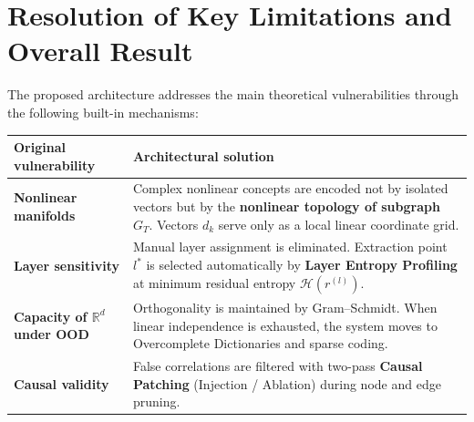 \documentclass[11pt,a4paper]{article}
\begin{document}
\section{Resolution of Key Limitations and Overall Result}
The proposed architecture addresses the main theoretical vulnerabilities through the following built-in mechanisms:
\begin{table}[h!]
\centering
\begin{tabular}{p{5cm} p{10cm}}
\toprule
\textbf{Original vulnerability} & \textbf{Architectural solution}\\
\midrule
\textbf{Nonlinear manifolds} & Complex nonlinear concepts are encoded not by isolated vectors but by the \textbf{nonlinear topology of subgraph $G_T$}. Vectors $d_k$ serve only as a local linear coordinate grid.\\
\addlinespace
\textbf{Layer sensitivity} & Manual layer assignment is eliminated. Extraction point $l^*$ is selected automatically by \textbf{Layer Entropy Profiling} at minimum residual entropy $\mathcal H(r^{(l)})$.\\
\addlinespace
\textbf{Capacity of $\mathbb R^d$ under OOD} & Orthogonality is maintained by Gram--Schmidt. When linear independence is exhausted, the system moves to Overcomplete Dictionaries and sparse coding.\\
\addlinespace
\textbf{Causal validity} & False correlations are filtered with two-pass \textbf{Causal Patching} (Injection / Ablation) during node and edge pruning.\\
\bottomrule
\end{tabular}
\end{table}

\normalsize
\end{document}
